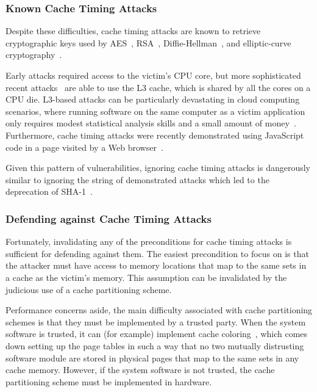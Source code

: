 \subsubsection{Known Cache Timing Attacks}

Despite these difficulties, cache timing attacks are known to retrieve
cryptographic keys used by AES~\cite{osvik2006aes, bonneau2006aes},
RSA~\cite{brumley2005rsa}, Diffie-Hellman~\cite{kocher1996timing}, and
elliptic-curve cryptography~\cite{brumley2011ecc}.

Early attacks required access to the victim's CPU core, but more sophisticated
recent attacks~\cite{yarom2013llctiming, liu2015llctiming} are able to use the
L3 cache, which is shared by all the cores on a CPU die. L3-based attacks can
be particularly devastating in cloud computing scenarios, where running
software on the same computer as a victim application only requires modest
statistical analysis skills and a small amount of
money~\cite{ristenpart2009colocation}. Furthermore, cache timing attacks were
recently demonstrated using JavaScript code in a page visited by a Web
browser~\cite{oren2015jstiming}.

Given this pattern of vulnerabilities, ignoring cache timing attacks is
dangerously similar to ignoring the string of demonstrated attacks which led to
the deprecation of SHA-1~\cite{nist2014sha1policy, google2014sha1deprecation,
microsoft2014sha1deprecation}.


\subsubsection{Defending against Cache Timing Attacks}

Fortunately, invalidating any of the preconditions for cache timing attacks is
sufficient for defending against them. The easiest precondition to focus on is
that the attacker must have access to memory locations that map to the same
sets in a cache as the victim's memory. This assumption can be invalidated by
the judicious use of a cache partitioning scheme.

Performance concerns aside, the main difficulty associated with cache
partitioning schemes is that they must be implemented by a trusted party. When
the system software is trusted, it can (for example) implement cache
coloring~\cite{taylor1990coloring}, which comes down setting up the page tables
in such a way that no two mutually distrusting software module are stored in
physical pages that map to the same sets in any cache memory. However, if the
system software is not trusted, the cache partitioning scheme must be
implemented in hardware.

